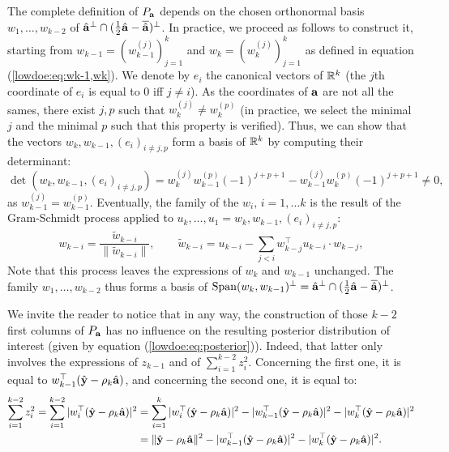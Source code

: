 {The complete definition of $P_{\mathbf{a}}$ depends on the chosen orthonormal basis $w_1,\dots,w_{k-2}$ of $\hat{\mathbf{a}}^\perp\cap(\frac{1}{2}\hat{\mathbf{a}}-\overline{\hat{\mathbf{a}}})^\perp$.
In practice, we proceed as follows to construct it, starting from $w_{k-1}=(w_{k-1}^{(j)})_{j=1}^k$ and $w_k=(w_k^{(j)})_{j=1}^k$ as defined in equation (\ref{lowdoe:eq:wk-1,wk}). 
We denote by $e_i$ the canonical vectors of $\mathbb{R}^k$ (the $j$th coordinate of $e_i$ is equal to $0$ iff $j\ne i$). As the coordinates of $\mathbf{a}$ are not all the sames, there exist $j,p$ such that $w_{k}^{(j)}\ne w_{k}^{(p)}$ (in practice, we select the minimal $j$ and the minimal $p$ such that this property is verified). Thus, we can show that the vectors $w_k,w_{k-1},(e_i)_{i\ne j,p}$ form a basis of $\mathbb{R}^k$ by computing their determinant:
    \begin{equation}
        \det(w_k,w_{k-1},(e_i)_{i\ne j,p}) = w_k^{(j)}w_{k-1}^{(p)}(-1)^{j+p+1} - w_{k-1}^{(j)}w_k^{(p)}(-1)^{j+p+1}\ne 0,
    \end{equation}
as $w_{k-1}^{(j)}=w_{k-1}^{(p)}$.
Eventually, the family of the $w_i,\,i=1,\dots k$ is the result of the Gram-Schmidt process applied to $u_k,\dots,u_1=w_k,w_{k-1},(e_i)_{i\ne j,p}$: 
    \begin{equation}
        w_{k-i} = \frac{\tilde w_{k-i}}{\|\tilde w_{k-i}\|},\qquad \tilde w_{k-i} = u_{k-i} - \sum_{j<i} w_{k-j}^{\top}u_{k-i}\cdot w_{k-j}, 
    \end{equation}
Note that this process leaves the expressions of $w_k$ and $w_{k-1}$ unchanged. The family $w_1,\dots,w_{k-2}$ thus forms a basis of $\operatorname{Span}(w_k,w_{k-1})^\perp=\hat{\mathbf{a}}^\perp\cap(\frac{1}{2}\hat{\mathbf{a}}-\overline{\hat{\mathbf{a}}})^\perp$.

We invite the reader to notice that in any way, the construction of those $k-2$ first columns of $P_{\mathbf{a}}$ has no influence on the resulting posterior distribution of interest (given by equation (\ref{lowdoe:eq:posterior})). Indeed, that latter only involves the expressions of $z_{k-1}$ and of $\sum_{i=1}^{k-2}z_i^2$. Concerning the first one, it is equal to $w_{k-1}^{\top}(\hat{\mathbf{y}}-\rho_k\hat{\mathbf{a}})$, and concerning the second one, it is equal to:
    \begin{align*}
            \sum_{i=1}^{k-2}z_i^2=\sum_{i=1}^{k-2}|w_i^{\top}(\hat{\mathbf{y}}-\rho_k\hat{\mathbf{a}})|^2&=\sum_{i=1}^{k}|w_i^{\top}(\hat{\mathbf{y}}-\rho_k\hat{\mathbf{a}})|^2-|w_{k-1}^{\top}(\hat{\mathbf{y}}-\rho_k\hat{\mathbf{a}} )|^2-|w_k^{\top}(\hat{\mathbf{y}}-\rho_k\hat{\mathbf{a}} )|^2\\
                &=\|\hat{\mathbf{y}}-\rho_k\hat{\mathbf{a}}\|^2-|w_{k-1}^{\top}(\hat{\mathbf{y}}-\rho_k\hat{\mathbf{a}} )|^2-|w_k^{\top}(\hat{\mathbf{y}}-\rho_k\hat{\mathbf{a}} )|^2.
        \end{align*}
    }




